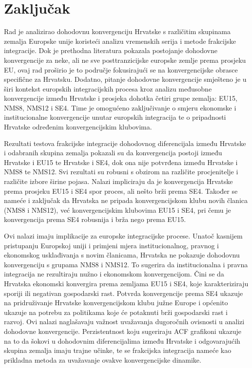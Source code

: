 \documentclass{crebsshr}
\begin{document}
\section{Zaključak}
Rad je analizirao dohodovnu konvergenciju Hrvatske s različitim skupinama zemalja Europske unije koristeći analizu vremenskih serija i metode frakcijske integracije. Dok je prethodna literatura pokazala postojanje dohodovne konvergencije za neke, ali ne sve posttranzicijske europske zemlje prema prosjeku EU, ovaj rad proširio je to područje fokusirajući se na konvergencijske obrasce specifične za Hrvatsku. Dodatno, pitanje dohodovne konvergencije smješteno je u širi kontekst europskih integracijskih procesa kroz analizu međusobne konvergencije između Hrvatske i prosjeka dohotka četiri grupe zemalja: EU15, NMS8, NMS12 i SE4. Time je omogućeno zaključivanje o smjeru ekonomske i institucionalne konvergencije unutar europskih integracija te o pripadnosti Hrvatske određenim konvergencijskim klubovima.

Rezultati testova frakcijske integracije dohodovnog diferencijala između Hrvatske i odabranih skupina zemalja pokazali su da konvergencija postoji između Hrvatske i EU15 te Hrvatske i SE4, dok ona nije potvrđena između Hrvatske i NMS8 te NMS12. Svi rezultati su robusni s obzirom na različite procjenitelje i različite izbore širine pojasa. Nalazi impliciraju da je konvergencija Hrvatske prema prosjeku EU15 i SE4 spor proces, ali nešto brži prema SE4. Također se nameće i zaključak da Hrvatska ne pripada konvergencijskom klubu novih članica (NMS8 i NMS12), već konvergencijskim klubovima EU15 i SE4, pri čemu je konvergencija prema SE4 robusnija i brža nego prema EU15.

Ovi nalazi imaju implikacije za europske integracijske procese. Unatoč kasnijem pristupanju Europskoj uniji i primjeni mjera institucionalnog, pravnog i ekonomskog usklađivanja s novim članicama, Hrvatska ne pokazuje dohodovnu konvergenciju s grupama NMS8 i NMS12. To sugerira da institucionalna i pravna integracija ne rezultiraju nužno i ekonomskom konvergencijom. Čini se da Hrvatska ekonomski konvergira prema zemljama EU15 i SE4, koje karakteriziraju sporiji ili negativan gospodarski rast. Potvrda konvergencije prema SE4 ukazuje na pridruživanje Hrvatske konvergencijskom klubu južne Europe i općenito ukazuje na potrebu za politikama koje će potaknuti brži gospodarski rast i razvoj. Ovi nalazi naglašavaju važnost uvažavanja dugoročnih ovisnosti u analizi dohodovne konvergencije. Perzistentnost koju sugeriraju ACF grafikoni ukazuje na to da šokovi u dohodovnim diferencijalima između Hrvatske i odgovarajućih skupina zemalja imaju trajne učinke, te se frakcijska integracija nameće kao prikladna metoda za uvažavanje ovakve konvergencijske dinamike.
\end{document}
